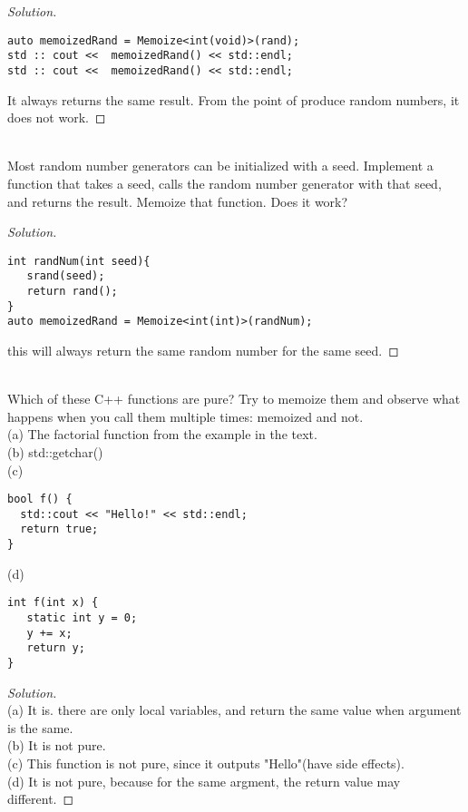 \documentclass[7x10,thmnumcontwithchapter,WebLink,AddlevelTwoTOC,NumRef,BookEndNote,printer]{pupbook}
\begin{document}
\begin{proof}[Solution]
~\\
\begin{lstlisting}
auto memoizedRand = Memoize<int(void)>(rand);
std :: cout <<  memoizedRand() << std::endl;
std :: cout <<  memoizedRand() << std::endl;
\end{lstlisting}	
It always returns the same result. From the point of produce random numbers, it does not work.
\end{proof}


\begin{exercise}
	~\\
Most random number generators can be initialized with a seed.
Implement a function that takes a seed, calls the random number
generator with that seed, and returns the result. Memoize that
function. Does it work?
\end{exercise}

\begin{proof}[Solution]
	~\\
\begin{lstlisting}
int randNum(int seed){
   srand(seed);
   return rand();
}
auto memoizedRand = Memoize<int(int)>(randNum);

\end{lstlisting}	
this will always return the same random number for the same seed.
\end{proof}



\begin{exercise}
	~\\
Which of these C++ functions are pure? Try to memoize them
and observe what happens when you call them multiple times:
memoized and not. \\
(a) The factorial function from the example in the text. \\
(b) std::getchar() \\
(c)
\begin{lstlisting}
bool f() {
  std::cout << "Hello!" << std::endl;
  return true;
}
\end{lstlisting}
(d) 
\begin{lstlisting}
int f(int x) {
   static int y = 0;
   y += x;
   return y;
}
\end{lstlisting}
\end{exercise}

\begin{proof}[Solution]
~\\
(a) It is. there are only local variables, and return the same value when argument is the same. \\
(b) It is not pure. \\
(c) This function is not pure, since it outputs "Hello"(have side effects). \\
(d) It is not pure, because for the same argment, the return value may different.   
\end{proof}
\end{document}
